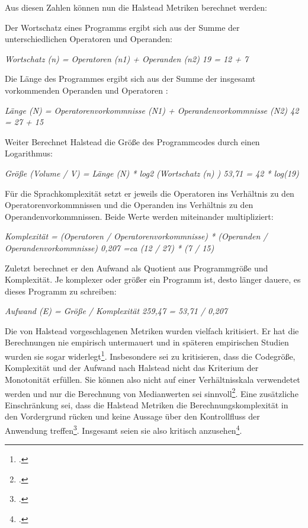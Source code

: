 Aus diesen Zahlen können nun die Halstead Metriken berechnet werden:

Der Wortschatz eines Programms ergibt sich aus der Summe der
unterschiedlichen Operatoren und Operanden:

\emph{Wortschatz (n) = Operatoren (n1) + Operanden (n2) 19 = 12 + 7}

Die Länge des Programmes ergibt sich aus der Summe der insgesamt
vorkommenden Operanden und Operatoren :

\emph{Länge (N) = Operatorenvorkommnisse (N1) + Operandenvorkommnisse
(N2) 42 = 27 + 15}

Weiter Berechnet Halstead die Grö\ss e des Programmcodes durch einen
Logarithmus:

\emph{Grö\ss e (Volume / V) = Länge (N) * log2 (Wortschatz (n) ) 53,71 = 42
* log(19)}

Für die Sprachkomplexität setzt er jeweils die Operatoren ins Verhältnis
zu den Operatorenvorkommnissen und die Operanden ins Verhältnis zu den
Operandenvorkommnissen. Beide Werte werden miteinander multipliziert:

\emph{Komplexität = (Operatoren / Operatorenvorkommnisse) * (Operanden /
Operandenvorkommnisse) 0,207 =ca (12 / 27) * (7 / 15)}

Zuletzt berechnet er den Aufwand als Quotient aus Programmgrö\ss e und
Komplexität. Je komplexer oder grö\ss er ein Programm ist, desto länger
dauere, es dieses Programm zu schreiben:

\emph{Aufwand (E) = Grö\ss e / Komplexität 259,47 = 53,71 / 0,207}

Die von Halstead vorgeschlagenen Metriken wurden vielfach kritisiert. Er
hat die Berechnungen nie empirisch untermauert und in späteren
empirischen Studien wurden sie sogar widerlegt\footcite[Vgl. ][S. 185]{sneedSoftwareZahlenVermessung2010}. Insbesondere sei zu kritisieren, dass die Codegrö\ss e,
Komplexität und der Aufwand nach Halstead nicht das Kriterium der
Monotonität erfüllen. Sie können also nicht auf einer Verhältnisskala
verwendetet werden und nur die Berechnung von Medianwerten sei
sinnvoll\footcite[Vgl. ][S. 142]{zuseSoftwareComplexityMeasures1991}. Eine zusätzliche Einschränkung
sei, dass die Halstead Metriken die Berechnungskomplexität in den
Vordergrund rücken und keine Aussage über den Kontrollfluss der
Anwendung treffen\footcite[Vgl. ][S. 2]{rumreichExaminingSoftwareDesign2019}. Insgesamt seien sie also kritisch anzusehen\footcite[Vgl. ][S. 185]{sneedSoftwareZahlenVermessung2010}.


